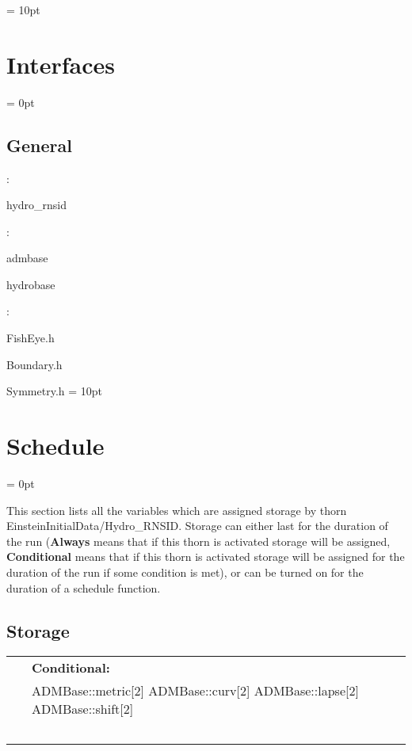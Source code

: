 \vspace{0.5cm}\parskip = 10pt 

\section{Interfaces} 


\parskip = 0pt

\vspace{3mm} \subsection*{General}

: 

hydro\_rnsid
\vspace{2mm}

: 

admbase

hydrobase
\vspace{2mm}

\vspace{5mm}

: 

FishEye.h

Boundary.h

Symmetry.h
\vspace{2mm}\parskip = 10pt 

\section{Schedule} 


\parskip = 0pt


\noindent This section lists all the variables which are assigned storage by thorn EinsteinInitialData/Hydro\_RNSID.  Storage can either last for the duration of the run ({\bf Always} means that if this thorn is activated storage will be assigned, {\bf Conditional} means that if this thorn is activated storage will be assigned for the duration of the run if some condition is met), or can be turned on for the duration of a schedule function.


\subsection*{Storage}

\hspace{5mm}

 \begin{tabular*}{160mm}{ll} 
~& {\bf Conditional:} \\ 
~ &  ADMBase::metric[2] ADMBase::curv[2] ADMBase::lapse[2] ADMBase::shift[2]\\ 
~ & ~\\ 
\end{tabular*} 


